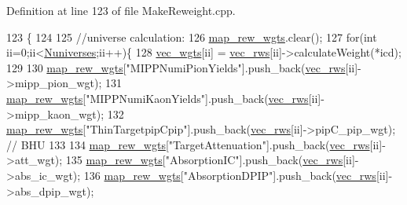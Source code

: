 Definition at line 123 of file Make\-Reweight.\-cpp.


\begin{DoxyCode}
123                                                       \{
124   
125     \textcolor{comment}{//universe calculation:}
126     \hyperlink{class_neutrino_flux_reweight_1_1_make_reweight_a2310ee6ae4dd8e0cd2d58c089192e38a}{map\_rew\_wgts}.clear();
127     \textcolor{keywordflow}{for}(\textcolor{keywordtype}{int} ii=0;ii<\hyperlink{class_neutrino_flux_reweight_1_1_make_reweight_a172e839a27e6c89dbaf9cb493c99bbef}{Nuniverses};ii++)\{
128       \hyperlink{class_neutrino_flux_reweight_1_1_make_reweight_ae164934137effb838289662f0f65c489}{vec\_wgts}[ii] = \hyperlink{class_neutrino_flux_reweight_1_1_make_reweight_a5110b72da0e87323e3f38703a48e7f3f}{vec\_rws}[ii]->calculateWeight(*icd);
129 
130       \hyperlink{class_neutrino_flux_reweight_1_1_make_reweight_a2310ee6ae4dd8e0cd2d58c089192e38a}{map\_rew\_wgts}[\textcolor{stringliteral}{"MIPPNumiPionYields"}].push\_back(\hyperlink{class_neutrino_flux_reweight_1_1_make_reweight_a5110b72da0e87323e3f38703a48e7f3f}{vec\_rws}[ii]->mipp\_pion\_wgt);
131       \hyperlink{class_neutrino_flux_reweight_1_1_make_reweight_a2310ee6ae4dd8e0cd2d58c089192e38a}{map\_rew\_wgts}[\textcolor{stringliteral}{"MIPPNumiKaonYields"}].push\_back(\hyperlink{class_neutrino_flux_reweight_1_1_make_reweight_a5110b72da0e87323e3f38703a48e7f3f}{vec\_rws}[ii]->mipp\_kaon\_wgt);
132       \hyperlink{class_neutrino_flux_reweight_1_1_make_reweight_a2310ee6ae4dd8e0cd2d58c089192e38a}{map\_rew\_wgts}[\textcolor{stringliteral}{"ThinTargetpipCpip"}].push\_back(\hyperlink{class_neutrino_flux_reweight_1_1_make_reweight_a5110b72da0e87323e3f38703a48e7f3f}{vec\_rws}[ii]->pipC\_pip\_wgt);       \textcolor{comment}{//
      BHU}
133    
134       \hyperlink{class_neutrino_flux_reweight_1_1_make_reweight_a2310ee6ae4dd8e0cd2d58c089192e38a}{map\_rew\_wgts}[\textcolor{stringliteral}{"TargetAttenuation"}].push\_back(\hyperlink{class_neutrino_flux_reweight_1_1_make_reweight_a5110b72da0e87323e3f38703a48e7f3f}{vec\_rws}[ii]->att\_wgt);            
135       \hyperlink{class_neutrino_flux_reweight_1_1_make_reweight_a2310ee6ae4dd8e0cd2d58c089192e38a}{map\_rew\_wgts}[\textcolor{stringliteral}{"AbsorptionIC"}].push\_back(\hyperlink{class_neutrino_flux_reweight_1_1_make_reweight_a5110b72da0e87323e3f38703a48e7f3f}{vec\_rws}[ii]->abs\_ic\_wgt);
136       \hyperlink{class_neutrino_flux_reweight_1_1_make_reweight_a2310ee6ae4dd8e0cd2d58c089192e38a}{map\_rew\_wgts}[\textcolor{stringliteral}{"AbsorptionDPIP"}].push\_back(\hyperlink{class_neutrino_flux_reweight_1_1_make_reweight_a5110b72da0e87323e3f38703a48e7f3f}{vec\_rws}[ii]->abs\_dpip\_wgt);

\end{DoxyCode}
